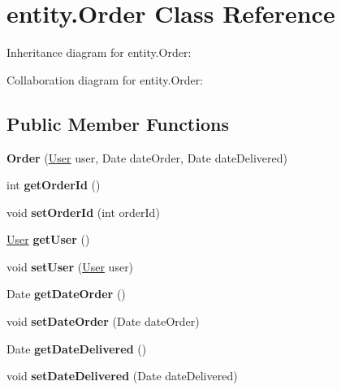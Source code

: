 \hypertarget{classentity_1_1_order}{}\section{entity.\+Order Class Reference}
\label{classentity_1_1_order}


Inheritance diagram for entity.\+Order\+:


Collaboration diagram for entity.\+Order\+:
\subsection*{Public Member Functions}
\begin{DoxyCompactItemize}
\item 
\mbox{\label{classentity_1_1_order_a5180af95fecce83f0416706550fed72d}} 
{\bfseries Order} (\mbox{\hyperlink{classentity_1_1_user}{User}} user, Date date\+Order, Date date\+Delivered)
\item 
\mbox{\label{classentity_1_1_order_a4561af92f26502434e496c32164ea1ff}} 
int {\bfseries get\+Order\+Id} ()
\item 
\mbox{\label{classentity_1_1_order_a780f89a2c6102d22cc7c076b7a038c8f}} 
void {\bfseries set\+Order\+Id} (int order\+Id)
\item 
\mbox{\label{classentity_1_1_order_a5262114e6d86f0826384b5aebaa04856}} 
\mbox{\hyperlink{classentity_1_1_user}{User}} {\bfseries get\+User} ()
\item 
\mbox{\label{classentity_1_1_order_ad8de4f52695d2a9230e9bdb0aa42decb}} 
void {\bfseries set\+User} (\mbox{\hyperlink{classentity_1_1_user}{User}} user)
\item 
\mbox{\label{classentity_1_1_order_a69a26d54af50e17b399f6af80433b569}} 
Date {\bfseries get\+Date\+Order} ()
\item 
\mbox{\label{classentity_1_1_order_a0c2fee67a9b341a27e83b875534bf9ea}} 
void {\bfseries set\+Date\+Order} (Date date\+Order)
\item 
\mbox{\label{classentity_1_1_order_a949fad3af9e1747db36124d934ed6413}} 
Date {\bfseries get\+Date\+Delivered} ()
\item 
\mbox{\label{classentity_1_1_order_a36942ca27b3ac8f905319ba13986ff19}} 
void {\bfseries set\+Date\+Delivered} (Date date\+Delivered)
\end{DoxyCompactItemize}



